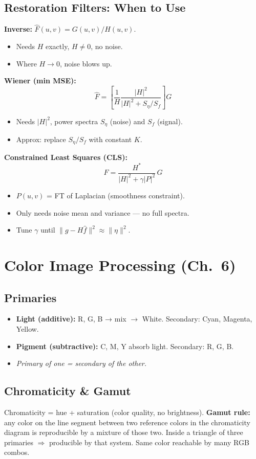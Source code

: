 \documentclass[10pt]{article}
\begin{document}
\subsection{Restoration Filters: When to Use}
\begin{tcolorbox}[warnbox]
\textbf{Inverse:} $\hat{F}(u,v) = G(u,v)/H(u,v)$.
\begin{itemize}
  \item Needs $H$ exactly, $H \ne 0$, no noise.
  \item Where $H\to 0$, noise blows up.
\end{itemize}
\textbf{Wiener (min MSE):}
\[
\hat{F} = \left[\frac{1}{H}\frac{|H|^2}{|H|^2 + S_\eta/S_f}\right] G
\]
\begin{itemize}
  \item Needs $|H|^2$, power spectra $S_\eta$ (noise) and $S_f$ (signal).
  \item Approx: replace $S_\eta/S_f$ with constant $K$.
\end{itemize}
\textbf{Constrained Least Squares (CLS):}
\[
\hat{F} = \frac{H^*}{|H|^2 + \gamma|P|^2}\, G
\]
\begin{itemize}
  \item $P(u,v)$ = FT of Laplacian (smoothness constraint).
  \item Only needs noise mean and variance — no full spectra.
  \item Tune $\gamma$ until $\|g - H\hat{f}\|^2 \approx \|\eta\|^2$.
\end{itemize}
\end{tcolorbox}

\section{Color Image Processing (Ch.~6)}

\subsection{Primaries}
\begin{itemize}
  \item \textbf{Light (additive):} R, G, B → mix $\to$ White. Secondary: Cyan, Magenta, Yellow.
  \item \textbf{Pigment (subtractive):} C, M, Y absorb light. Secondary: R, G, B.
  \item \emph{Primary of one = secondary of the other.}
\end{itemize}

\subsection{Chromaticity \& Gamut}
Chromaticity = hue + saturation (color quality, no brightness).
\textbf{Gamut rule:} any color on the line segment between two reference colors in the chromaticity diagram is reproducible by a mixture of those two. Inside a triangle of three primaries $\Rightarrow$ producible by that system. Same color reachable by many RGB combos.
\end{document}
